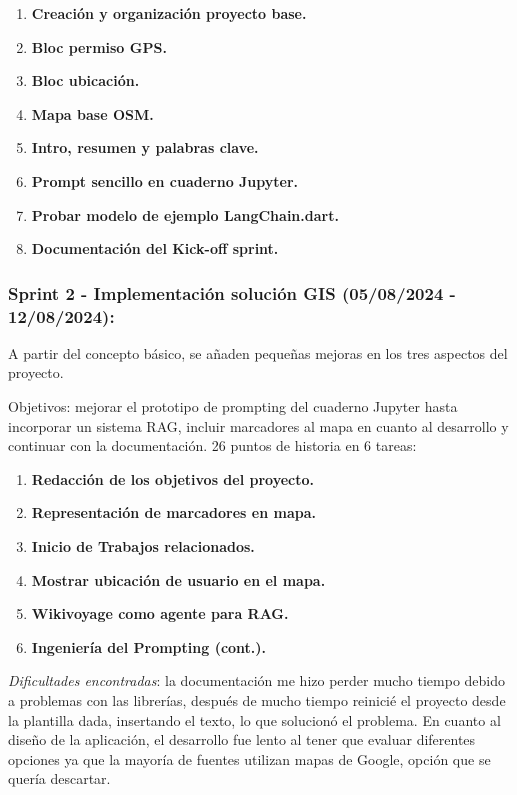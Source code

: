     \begin{enumerate}
    	\item \textbf{Creación y organización proyecto base.}
    	\item \textbf{Bloc permiso GPS.}
    	\item \textbf{Bloc ubicación.}
    	\item \textbf{Mapa base OSM.}
    	\item \textbf{Intro, resumen y palabras clave.}
    	\item \textbf{Prompt sencillo en cuaderno Jupyter.}
    	\item \textbf{Probar modelo de ejemplo LangChain.dart.}
    	\item \textbf{Documentación del Kick-off sprint.}
    \end{enumerate}
        
    
\subsubsection{Sprint 2 - Implementación solución GIS (05/08/2024 - 12/08/2024):} 
A partir del concepto básico, se añaden pequeñas mejoras en los tres aspectos del proyecto.
    
    Objetivos: mejorar el prototipo de prompting del cuaderno Jupyter hasta incorporar un sistema RAG, incluir marcadores al mapa en cuanto al desarrollo y continuar con la documentación. 26 puntos de historia en 6 tareas:

	\begin{enumerate}
		\item \textbf{Redacción de los objetivos del proyecto.}
		\item \textbf{Representación de marcadores en mapa.}
		\item \textbf{Inicio de Trabajos relacionados.}
		\item \textbf{Mostrar ubicación de usuario en el mapa.}
		\item \textbf{Wikivoyage como agente para RAG.}
		\item \textbf{Ingeniería del Prompting (cont.).}
	\end{enumerate}
        
    
    \textit{Dificultades encontradas}: la documentación me hizo perder mucho tiempo debido a problemas con las librerías, después de mucho tiempo reinicié el proyecto desde la plantilla dada, insertando el texto, lo que solucionó el problema. En cuanto al diseño de la aplicación, el desarrollo fue lento al tener que evaluar diferentes opciones ya que la mayoría de fuentes utilizan mapas de Google, opción que se quería descartar.
 

